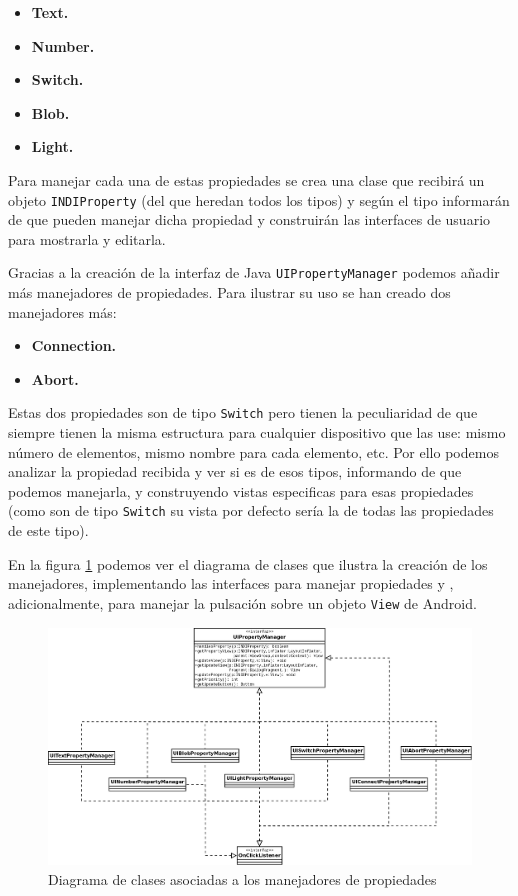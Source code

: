 \begin{itemize}
  \item \textbf{Text.}
  \item \textbf{Number.}
  \item \textbf{Switch.}
  \item \textbf{Blob.}
  \item \textbf{Light.}
\end{itemize}

\bigskip
Para manejar cada una de estas propiedades se crea una clase que recibirá un objeto \texttt{INDIProperty} (del que heredan todos los tipos) y según el tipo informarán de que pueden manejar dicha propiedad y construirán las interfaces de usuario para mostrarla y editarla.

\bigskip
Gracias a la creación de la interfaz de Java \texttt{UIPropertyManager} podemos añadir más manejadores de propiedades. Para ilustrar su uso se han creado dos manejadores más:

\begin{itemize}
  \item \textbf{Connection.}
  \item \textbf{Abort.}
\end{itemize}

\bigskip
Estas dos propiedades son de tipo \texttt{Switch} pero tienen la peculiaridad de que siempre tienen la misma estructura para cualquier dispositivo que las use: mismo número de elementos, mismo nombre para cada elemento, etc. Por ello podemos analizar la propiedad recibida y ver si es de esos tipos, informando de que podemos manejarla, y construyendo vistas especificas para esas propiedades (como son de tipo \texttt{Switch} su vista por defecto sería la de todas las propiedades de este tipo).

\bigskip
En la figura \ref{fig:diag_manager_ui} podemos ver el diagrama de clases que ilustra la creación de los manejadores, implementando las interfaces para manejar propiedades y , adicionalmente, para manejar la pulsación sobre un objeto \texttt{View} de Android.

\bigskip
\begin{figure}[!ht]
  \begin{center}
  \includegraphics[width=1\textwidth]{../images/manager_ui.png}
  \caption{Diagrama de clases asociadas a los manejadores de propiedades}
  \label{fig:diag_manager_ui}
  \end{center}
\end{figure}

